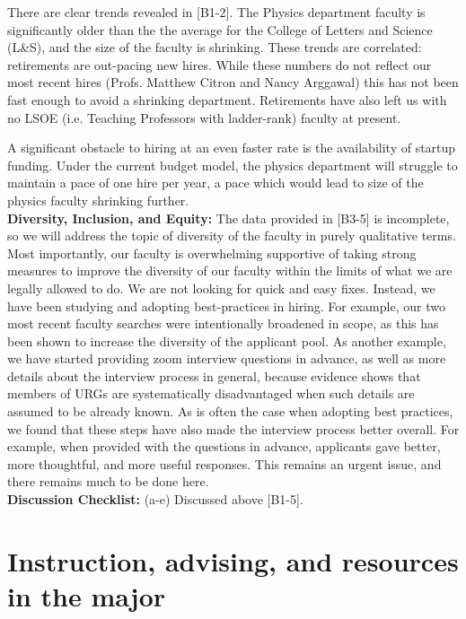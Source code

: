 \documentclass[12pt]{article}
\begin{document}
 There are clear trends
revealed in [B1-2].  The Physics department faculty is significantly
older than the the average for the College of Letters and Science
(L\&S), and the size of the faculty is shrinking.  These trends are
correlated: retirements are out-pacing new hires.  While these numbers
do not reflect our most recent hires (Profs. Matthew Citron and Nancy
Arggawal) this has not been fast enough to avoid a shrinking
department.  Retirements have also left us with no LSOE (i.e. Teaching
Professors with ladder-rank) faculty at present.

A significant obstacle to hiring at an even faster rate is the
availability of startup funding.  Under the current budget model, the
physics department will struggle to maintain a pace of one hire per
year, a pace which would lead to size of the physics faculty shrinking
further.\\[3pt]

\noindent
{\bf Diversity, Inclusion, and Equity:} The data provided in [B3-5] is
incomplete, so we will address the topic of diversity of the faculty
in purely qualitative terms.  Most importantly, our faculty is
overwhelming supportive of taking strong measures to improve the
diversity of our faculty within the limits of what we are legally
allowed to do.  We are not looking for quick and easy fixes.  Instead,
we have been studying and adopting best-practices in hiring.  For
example, our two most recent faculty searches were intentionally
broadened in scope, as this has been shown to increase the diversity
of the applicant pool.  As another example, we have started providing
zoom interview questions in advance, as well as more details about the
interview process in general, because evidence shows that members of
URGs are systematically disadvantaged when such details are assumed to
be already known.  As is often the case when adopting best practices,
we found that these steps have also made the interview process better
overall. For example, when provided with the questions in advance,
applicants gave better, more thoughtful, and more useful responses.
This remains an urgent issue, and there remains much to be done
here.\\[3pt]

\noindent
{\bf Discussion Checklist:} (a-e) Discussed above [B1-5].

\newpage
\section{Instruction, advising, and resources in the major}
\label{sec:instruction}
\end{document}
